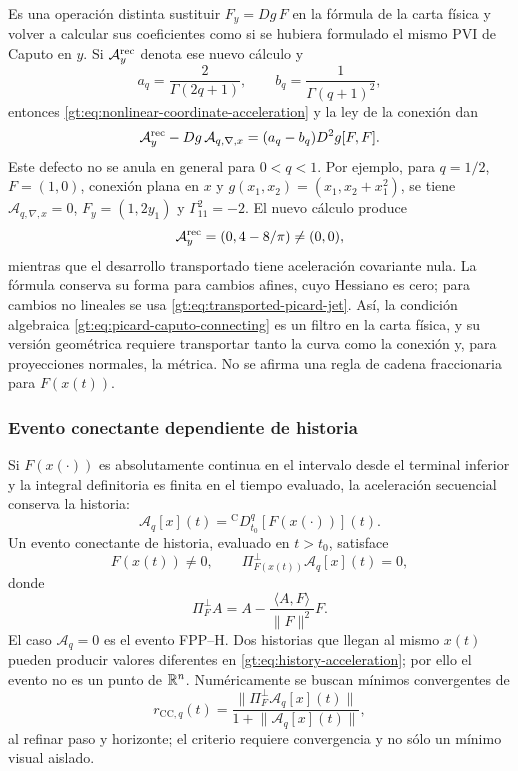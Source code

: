 Es una operación distinta sustituir $F_y=Dg\,F$ en la fórmula de la carta
física y volver a calcular sus coeficientes como si se hubiera formulado el
mismo PVI de Caputo en $y$. Si $\mathcal A^{\rm rec}_y$ denota ese nuevo
cálculo y
\[
 a_q=\frac{2}{\Gamma(2q+1)},\qquad
 b_q=\frac{1}{\Gamma(q+1)^2},
\]
entonces \eqref{gt:eq:nonlinear-coordinate-acceleration} y la ley de la
conexión dan
\begin{equation}
 \mathcal A^{\rm rec}_y-Dg\,\mathcal A_{q,\nabla,x}
 =(a_q-b_q)D^2g[F,F].
 \label{gt:eq:picard-recomputed-defect}
\end{equation}
Este defecto no se anula en general para $0<q<1$. Por ejemplo, para
$q=1/2$, $F=(1,0)$, conexión plana en $x$ y
$g(x_1,x_2)=(x_1,x_2+x_1^2)$, se tiene $\mathcal A_{q,\nabla,x}=0$,
$F_y=(1,2y_1)$ y $\Gamma^2_{11}=-2$. El nuevo cálculo produce
\[
 \mathcal A^{\rm rec}_y=(0,4-8/\pi)\ne(0,0),
\]
mientras que el desarrollo transportado tiene aceleración covariante nula.
La fórmula conserva su forma para cambios afines, cuyo Hessiano es cero;
para cambios no lineales se usa \eqref{gt:eq:transported-picard-jet}.
Así, la condición algebraica \eqref{gt:eq:picard-caputo-connecting} es un
filtro en la carta física, y su versión geométrica requiere transportar
tanto la curva como la conexión y, para proyecciones normales, la métrica.
No se afirma una regla de cadena fraccionaria para $F(x(t))$.

\subsubsection{Evento conectante dependiente de historia}

Si $F(x(\cdot))$ es absolutamente continua en el intervalo desde el terminal
inferior y la integral definitoria es finita en el tiempo evaluado, la
aceleración secuencial conserva la historia:
\begin{equation}
 \mathcal A_q[x](t)
 ={}^{\mathrm C}D_{t_0}^{q}[F(x(\cdot))](t).
 \label{gt:eq:history-acceleration}
\end{equation}
Un evento conectante de historia, evaluado en $t>t_0$, satisface
\begin{equation}
 F(x(t))\ne0,
 \qquad
 \Pi_{F(x(t))}^{\perp}\mathcal A_q[x](t)=0,
 \label{gt:eq:history-connecting-event}
\end{equation}
donde
\begin{equation}
 \Pi_F^\perp A=A-\frac{\langle A,F\rangle}{\lVert F\rVert^2}F.
 \label{gt:eq:history-normal-projection}
\end{equation}
El caso $\mathcal A_q=0$ es el evento FPP--H. Dos historias que llegan al mismo
$x(t)$ pueden producir valores diferentes en
\eqref{gt:eq:history-acceleration}; por ello el evento no es un punto de
$\mathbb{R}^n$. Numéricamente se buscan mínimos convergentes de
\begin{equation}
 r_{\mathrm{CC},q}(t)=
 \frac{\lVert\Pi_F^\perp\mathcal A_q[x](t)\rVert}
 {1+\lVert\mathcal A_q[x](t)\rVert},
 \label{gt:eq:history-connecting-residual}
\end{equation}
al refinar paso y horizonte; el criterio requiere convergencia y no sólo un
mínimo visual aislado.

